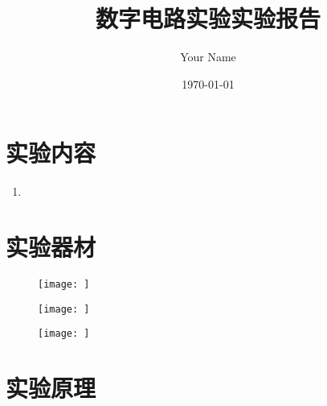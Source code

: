 \documentclass{ctexart}
\title{数字电路实验\quad 实验报告}
\author{Your Name}
\date{\today}
\begin{document}
\maketitle
\section{实验内容}
\begin{enumerate}
    \item 
\end{enumerate}
\section{实验器材}
\begin{figure}[H]
    \centering
    \begin{minipage}{0.25\textwidth}
    \centering
           \texttt{[image: ]}
           \caption{}
    \label{}
    \end{minipage}
    \hspace{0.05\textwidth}
    \begin{minipage}{0.25\textwidth}
    \centering
           \texttt{[image: ]}
           \caption{}
    \label{}
    \end{minipage}
     \hspace{0.05\textwidth}
    \begin{minipage}{0.28\textwidth}
    \centering
           \texttt{[image: ]}
           \caption{}
    \label{}
    \end{minipage}
\end{figure}
\section{实验原理}
\end{document}
